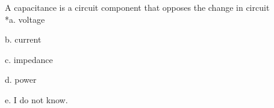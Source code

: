 
A capacitance is a circuit component that opposes the change in circuit\\

*a. voltage

b. current

c. impedance

d. power

e. I do not know.\\
